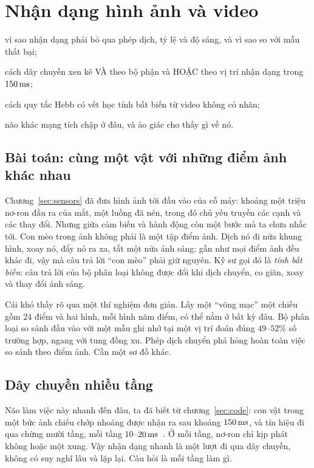 \chapter{Nhận dạng hình ảnh và video}
\label{sec:recognition}
\begin{chaptergoals}
\item vì sao nhận dạng phải bỏ qua phép dịch, tỷ lệ và độ sáng, và vì sao so với mẫu thất bại;
\item cách dây chuyền xen kẽ VÀ theo bộ phận và HOẶC theo vị trí nhận dạng trong $150\,\text{ms}$;
\item cách quy tắc Hebb có vết học tính bất biến từ video không có nhãn;
\item não khác mạng tích chập ở đâu, và ảo giác cho thấy gì về nó.
\end{chaptergoals}

\section{Bài toán: cùng một vật với những điểm ảnh khác nhau}

Chương~\ref{sec:sensors} đã đưa hình ảnh tới đầu vào của cỗ máy: khoảng một triệu nơ-ron đầu ra của mắt, một luồng đã nén, trong đó chủ yếu truyền các cạnh và các thay đổi. Nhưng giữa cảm biến và hành động còn một bước mà ta chưa nhắc tới. Con mèo trong ảnh không phải là một tập điểm ảnh. Dịch nó đi nửa khung hình, xoay nó, đẩy nó ra xa, tắt một nửa ánh sáng: gần như mọi điểm ảnh đều khác đi, vậy mà câu trả lời ``con mèo'' phải giữ nguyên. Kỹ sư gọi đó là \emph{tính bất biến}: câu trả lời của bộ phân loại không được đổi khi dịch chuyển, co giãn, xoay và thay đổi ánh sáng.

Cái khó thấy rõ qua một thí nghiệm đơn giản. Lấy một ``võng mạc'' một chiều gồm $24$ điểm và hai hình, mỗi hình năm điểm, có thể nằm ở bất kỳ đâu. Bộ phân loại so sánh đầu vào với một mẫu ghi nhớ tại một vị trí đoán đúng $49$--$52\%$ số trường hợp, ngang với tung đồng xu. Phép dịch chuyển phá hỏng hoàn toàn việc so sánh theo điểm ảnh. Cần một sơ đồ khác.

\section{Dây chuyền nhiều tầng}

Não làm việc này nhanh đến đâu, ta đã biết từ chương~\ref{sec:code}: con vật trong một bức ảnh chiếu chớp nhoáng được nhận ra sau khoảng $150\,\text{ms}$, và tín hiệu đi qua chừng mười tầng, mỗi tầng $10$--$20\,\text{ms}$~\cite{Thorpe1996}. Ở mỗi tầng, nơ-ron chỉ kịp phát không hoặc một xung. Vậy nhận dạng nhanh là một lượt đi qua dây chuyền, không có suy nghĩ lâu và lặp lại. Câu hỏi là mỗi tầng làm gì.

